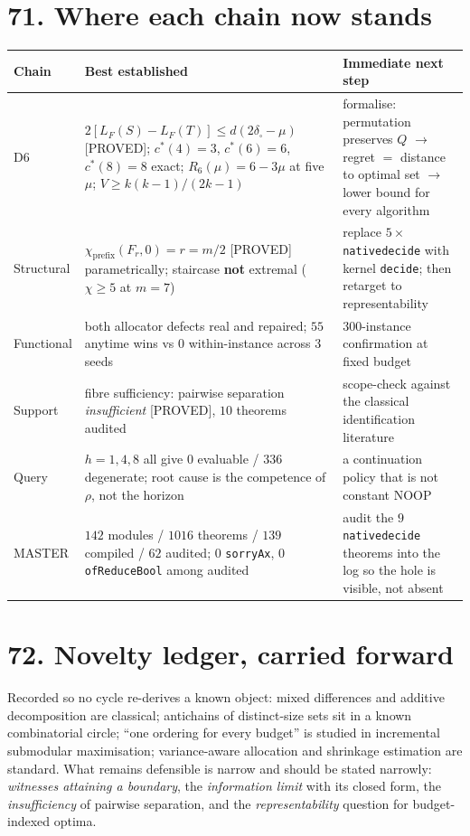 \documentclass[9pt,twocolumn]{article}
\newcommand{\eclass}[1]{\textsf{[#1]}}
\renewcommand{\_}{\CIGunderscore\allowbreak}
\begin{document}
\section*{71. Where each chain now stands}
\begin{center}\scriptsize
\begin{tabularx}{0.98\columnwidth}{l X X}
\toprule
Chain & Best established & Immediate next step\\
\midrule
D6 & $2[L_F(S)-L_F(T)]\le d(2\delta_\square-\mu)$ \eclass{PROVED}; $c^\ast(4)=3$, $c^\ast(6)=6$, $c^\ast(8)=8$ exact; $R_6(\mu)=6-3\mu$ at five $\mu$; $V\ge k(k-1)/(2k-1)$ & formalise: permutation preserves $Q$ $\to$ regret $=$ distance to optimal set $\to$ lower bound for every algorithm\\
Structural & $\chi_{\mathrm{prefix}}(F_r,0)=r=m/2$ \eclass{PROVED} parametrically; staircase \textbf{not} extremal ($\chi\ge5$ at $m=7$) & replace $5\times$ \texttt{native\_decide} with kernel \texttt{decide}; then retarget to representability\\
Functional & both allocator defects real and repaired; $55$ anytime wins vs $0$ within-instance across $3$ seeds & $300$-instance confirmation at fixed budget\\
Support & fibre sufficiency: pairwise separation \emph{insufficient} \eclass{PROVED}, $10$ theorems audited & scope-check against the classical identification literature\\
Query & $h=1,4,8$ all give $0$ evaluable / $336$ degenerate; root cause is the competence of $\rho$, not the horizon & a continuation policy that is not constant NOOP\\
MASTER & $142$ modules / $1016$ theorems / $139$ compiled / $62$ audited; $0$ \texttt{sorryAx}, $0$ \texttt{ofReduceBool} among audited & audit the $9$ \texttt{native\_decide} theorems into the log so the hole is visible, not absent\\
\bottomrule
\end{tabularx}
\end{center}

\section*{72. Novelty ledger, carried forward}
Recorded so no cycle re-derives a known object: mixed differences and additive decomposition are classical; antichains of distinct-size sets sit in a known combinatorial circle; ``one ordering for every budget'' is studied in incremental submodular maximisation; variance-aware allocation and shrinkage estimation are standard. What remains defensible is narrow and should be stated narrowly: \emph{witnesses attaining a boundary}, the \emph{information limit} with its closed form, the \emph{insufficiency} of pairwise separation, and the \emph{representability} question for budget-indexed optima.
\end{document}
